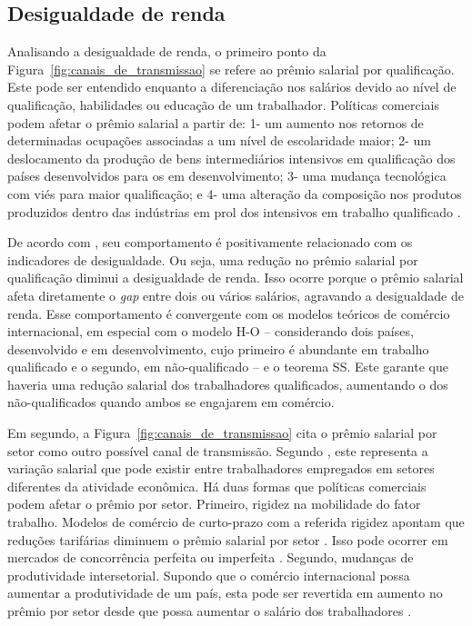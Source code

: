 \subsection{Desigualdade de renda} \label{subsec:desigualdade_de_renda}

Analisando a desigualdade de renda, o primeiro ponto da Figura~\ref{fig:canais_de_transmissao} se refere ao prêmio salarial por qualificação. Este pode ser entendido enquanto a diferenciação nos salários devido ao nível de qualificação, habilidades ou educação de um trabalhador. Políticas comerciais podem afetar o prêmio salarial a partir de: 1- um aumento nos retornos de determinadas ocupações associadas a um nível de escolaridade maior; 2- um deslocamento da produção de bens intermediários intensivos em qualificação dos países desenvolvidos para os em desenvolvimento; 3- uma mudança tecnológica com viés para maior qualificação; e 4- uma alteração da composição nos produtos produzidos dentro das indústrias em prol dos intensivos em trabalho qualificado \cite{goldbergpavcnik04}.

De acordo com \textcite{goldbergpavcnik04}, seu comportamento é positivamente relacionado com os indicadores de desigualdade. Ou seja, uma redução no prêmio salarial por qualificação diminui a desigualdade de renda. Isso ocorre porque o prêmio salarial afeta diretamente o \textit{gap} entre dois ou vários salários, agravando a desigualdade de renda. Esse comportamento é convergente com os modelos teóricos de comércio internacional, em especial com o modelo H-O -- considerando dois países, desenvolvido e em desenvolvimento, cujo primeiro é abundante em trabalho qualificado e o segundo, em não-qualificado -- e o teorema SS. Este garante que haveria uma redução salarial dos trabalhadores qualificados, aumentando o dos não-qualificados quando ambos se engajarem em comércio.

Em segundo, a Figura~\ref{fig:canais_de_transmissao} cita o prêmio salarial por setor como outro possível canal de transmissão. Segundo \textcite{goldbergpavcnik04}, este representa a variação salarial que pode existir entre trabalhadores empregados em setores diferentes da atividade econômica. Há duas formas que políticas comerciais podem afetar o prêmio por setor. Primeiro, rigidez na mobilidade do fator trabalho. Modelos de comércio de curto-prazo com a referida rigidez apontam que reduções tarifárias diminuem o prêmio salarial por setor \cite{heckman00}. Isso pode ocorrer em mercados de concorrência perfeita ou imperfeita \cite{harrison03}. Segundo, mudanças de produtividade intersetorial. Supondo que o comércio internacional possa aumentar a produtividade de um país, esta pode ser revertida em aumento no prêmio por setor desde que possa aumentar o salário dos trabalhadores \cite{hay01}.

